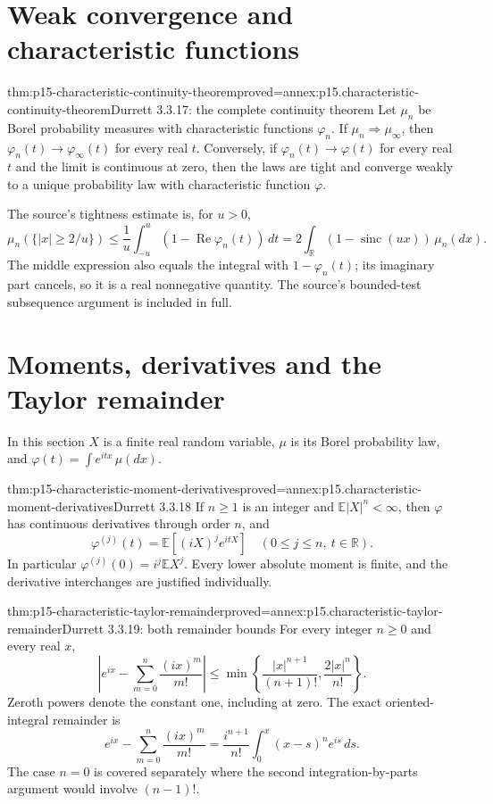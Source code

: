 \section{Weak convergence and characteristic functions}
\label{sec:p15-characteristic-continuity}

\begin{hbtheorem}{thm:p15-characteristic-continuity-theorem}{proved=annex:p15.characteristic-continuity-theorem}{Durrett 3.3.17: the complete continuity theorem}
Let \(\mu_n\) be Borel probability measures with characteristic
functions \(\varphi_n\).
If \(\mu_n\Rightarrow\mu_\infty\), then
\(\varphi_n(t)\to\varphi_\infty(t)\) for every real \(t\).
Conversely, if \(\varphi_n(t)\to\varphi(t)\) for every real \(t\)
and the limit is continuous at zero, then the laws are tight
and converge weakly to a unique probability law with
characteristic function \(\varphi\).

The source's tightness estimate is, for \(u>0\),
\[
 \mu_n(\{|x|\geq2/u\})
 \leq\frac1u\int_{-u}^u(1-\operatorname{Re}\varphi_n(t))\,dt
 =2\int_{\mathbb R}(1-\operatorname{sinc}(ux))\,\mu_n(dx).
\]
The middle expression also equals the integral with
\(1-\varphi_n(t)\); its imaginary part cancels, so it is
a real nonnegative quantity.
The source's bounded-test subsequence argument is included
in full.
\end{hbtheorem}

\section{Moments, derivatives and the Taylor remainder}
\label{sec:p15-characteristic-moments}

In this section \(X\) is a finite real random variable, \(\mu\)
is its Borel probability law, and
\(\varphi(t)=\int e^{itx}\,\mu(dx)\).

\begin{hbtheorem}{thm:p15-characteristic-moment-derivatives}{proved=annex:p15.characteristic-moment-derivatives}{Durrett 3.3.18}
If \(n\geq1\) is an integer and \(\mathbb E|X|^n<\infty\),
then \(\varphi\) has continuous derivatives through order \(n\),
and
\[
 \varphi^{(j)}(t)=\mathbb E[(iX)^j e^{itX}]
                 \quad(0\leq j\leq n,\ t\in\mathbb R).
\]
In particular \(\varphi^{(j)}(0)=i^j\mathbb EX^j\).
Every lower absolute moment is finite, and the derivative
interchanges are justified individually.
\end{hbtheorem}

\begin{hblemma}{thm:p15-characteristic-taylor-remainder}{proved=annex:p15.characteristic-taylor-remainder}{Durrett 3.3.19: both remainder bounds}
For every integer \(n\geq0\) and every real \(x\),
\[
 \left|e^{ix}-\sum_{m=0}^n\frac{(ix)^m}{m!}\right|
 \leq\min\left\{\frac{|x|^{n+1}}{(n+1)!},
                         \frac{2|x|^n}{n!}\right\}.
\]
Zeroth powers denote the constant one, including at zero.
The exact oriented-integral remainder is
\[
 e^{ix}-\sum_{m=0}^n\frac{(ix)^m}{m!}
       =\frac{i^{n+1}}{n!}\int_0^x(x-s)^n e^{is}\,ds.
\]
The case \(n=0\) is covered separately where the second
integration-by-parts argument would involve \((n-1)!\).
\end{hblemma}

